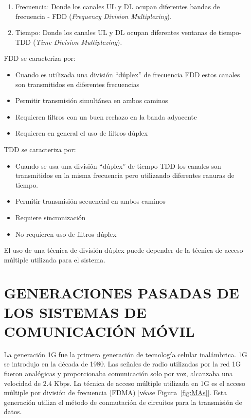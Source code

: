 \begin{enumerate}
\item  Frecuencia: Donde los canales UL y DL ocupan diferentes bandas de frecuencia - FDD (\textit{Frequency Division Multiplexing}).
\item  Tiempo: Donde los canales UL y DL ocupan diferentes ventanas de tiempo- TDD (\textit{Time Division Multiplexing}).
\end{enumerate}

FDD se caracteriza por: 
\begin{itemize}
\item  Cuando es utilizada una división ``dúplex'' de frecuencia FDD estos canales son transmitidos en diferentes frecuencias
\item  Permitir transmisión simultánea en ambos caminos
\item  Requieren filtros con un buen rechazo en la banda adyacente
\item  Requieren en general el uso de filtros dúplex
\end{itemize}

TDD se caracteriza por: 
\begin{itemize}
\item  Cuando se usa una división ``dúplex'' de tiempo TDD los canales son transmitidos en la misma frecuencia pero utilizando diferentes ranuras de tiempo.
\item  Permitir transmisión secuencial en ambos caminos
\item  Requiere sincronización
\item  No requieren uso de filtros dúplex
\end{itemize}

El uso de una técnica de división dúplex puede depender de la técnica de acceso múltiple utilizada para el sistema.


\section{GENERACIONES PASADAS DE LOS SISTEMAS DE COMUNICACIÓN MÓVIL}

La generación 1G fue la primera generación de tecnología celular inalámbrica. 1G se introdujo en la década de 1980. Las señales de radio utilizadas por la red 1G fueron analógicas y proporcionaba comunicación solo por voz, alcanzaba una velocidad de 2.4 Kbps. La técnica de acceso múltiple utilizada en 1G es el acceso múltiple por división de frecuencia (FDMA) [véase Figura~\ref{fig:MAs}]\parencite{Nair2018}. Esta generación utiliza el método de conmutación de circuitos para la transmisión de datos. \newline

